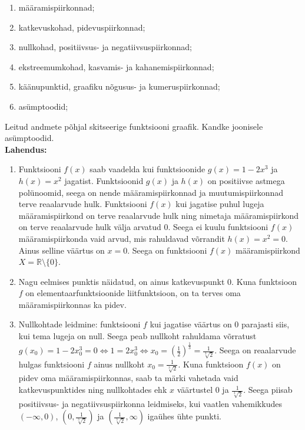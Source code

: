 \documentclass{article}
\begin{document}
\begin{enumerate}
	\item m\"a\"aramispiirkonnad;
	\item katkevuskohad, pidevuspiirkonnad;
	\item nullkohad, positiivsus- ja negatiivsuspiirkonnad;
	\item ekstreemumkohad, kasvamis- ja kahanemispiirkonnad;
	\item k\"a\"anupunktid, graafiku n\~ogusus- ja kumeruspiirkonnad;
	\item as\"umptoodid;
\end{enumerate}
Leitud andmete p\~ohjal skitseerige funktsiooni graafik. Kandke joonisele as\"umptoodid.\\
\textbf{Lahendus:}
\begin{enumerate}
	\item Funktsiooni $f(x)$ saab vaadelda kui funktsioonide $g(x)=1-2x^3$ ja $h(x)=x^2$ jagatist. Funktsioonid $g(x)$ ja $h(x)$ on positiivse astmega pol\"unoomid, seega on nende m\"a\"aramispiirkonnad ja muutumispiirkonnad terve reaalarvude hulk. Funktsiooni $f(x)$ kui jagatise puhul lugeja m\"a\"aramispiirkond on terve reaalarvude hulk ning nimetaja m\"a\"aramispiirkond on terve reaalarvude hulk v\"alja arvatud 0. Seega ei kuulu funktsiooni $f(x)$ m\"a\"aramispiirkonda vaid arvud, mis rahuldavad v\~orrandit $h(x)=x^2=0$. Ainus selline v\"a\"artus on $x=0$. Seega on funktsiooni $f(x)$ m\"a\"aramispiirkond $X=\mathbb{R}\setminus\{0\}$.
	\item Nagu eelmises punktis n\"aidatud, on ainus katkevuspunkt 0. Kuna funktsioon $f$ on elementaarfunktsioonide liitfunktsioon, on ta terves oma m\"a\"aramispiirkonnas ka pidev.
	\item Nullkohtade leidmine: funktsiooni $f$ kui jagatise v\"a\"artus on 0 parajasti siis, kui tema lugeja on null. Seega peab nullkoht rahuldama v\~orratust $g(x_0)=1-2x_0^3=0\Leftrightarrow1=2x_0^3\Leftrightarrow x_0=\left(\frac{1}{2}\right)^{\frac{1}{3}}=\frac{1}{\sqrt[3]{2}}$. Seega on reaalarvude hulgas funktsiooni $f$ ainus nullkoht $x_0=\frac{1}{\sqrt[3]{2}}$. Kuna funktsioon $f(x)$ on pidev oma m\"a\"aramispiirkonnas, saab ta m\"arki vahetada vaid katkevuspunktides ning nullkohtades ehk $x$ v\"a\"artustel 0 ja $\frac{1}{\sqrt[3]{2}}$. Seega piisab positiivsus- ja negatiivsuspiirkonna leidmiseks, kui vaatlen vahemikkudes $(-\infty,0)$, $(0,\frac{1}{\sqrt[3]{2}})$ ja $(\frac{1}{\sqrt[3]{2}},\infty)$ iga\"uhes \"uhte punkti.\\
	\begin{equation*}

\end{equation*}
\end{enumerate}
\end{document}
